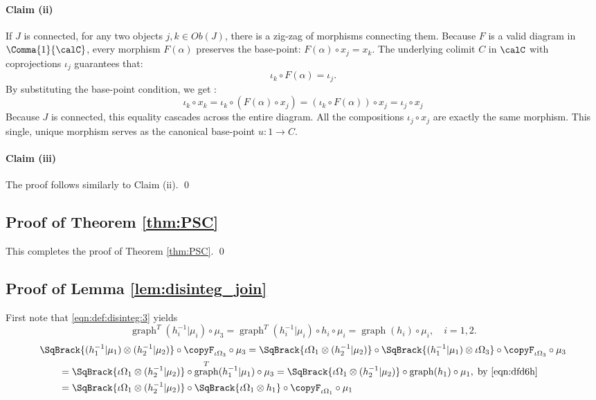 \documentclass[12pt,oneside,pb-diagram]{article}
\DeclareMathOperator{\graph}{graph}
\begin{document}
\paragraph{Claim (ii)} If $J$ is connected, for any two objects $j, k \in Ob(J)$, there is a zig-zag of morphisms connecting them. Because $F$ is a valid diagram in $\Comma{1}{\calC}$, every morphism $F(\alpha)$ preserves the base-point: $F(\alpha) \circ x_j = x_k$. The underlying colimit $C$ in $\calC$ with coprojections $\iota_j$ guarantees that:
\[\iota_k \circ F(\alpha) = \iota_j.\]
By substituting the base-point condition, we get : 
\[\iota_k \circ x_k = \iota_k \circ (F(\alpha) \circ x_j) = (\iota_k \circ F(\alpha)) \circ x_j = \iota_j \circ x_j\]
Because $J$ is connected, this equality cascades across the entire diagram. All the compositions $\iota_j \circ x_j$ are exactly the same morphism. This single, unique morphism serves as the canonical base-point $u: 1 \to C$.

\paragraph{Claim (iii)} The proof follows similarly to Claim (ii). \qed



\subsection{Proof of Theorem \ref{thm:PSC}} \label{sec:proof:PSC}

This completes the proof of Theorem \ref{thm:PSC}. \qed

\subsection{Proof of Lemma \ref{lem:disinteg_join}} \label{sec:proof:disinteg_join}

First note that \eqref{eqn:def:disinteg:3} yields
%
\begin{equation} \label{eqn:dfd6h}
	\graph^T(h_i^{-1}|\mu_i) \circ \mu_3 = \graph^T(h_i^{-1}|\mu_i) \circ h_i \circ \mu_i = \graph(h_i) \circ \mu_i, \quad i=1,2.
\end{equation}
%
%
\[\begin{split}
	& \SqBrack{ (h_1^{-1}|\mu_1) \otimes (h_2^{-1}|\mu_2) } \circ \copyF_{\iota \Omega_3} \circ \mu_3 = \SqBrack{ \iota \Omega_1 \otimes (h_2^{-1}|\mu_2) } \circ \SqBrack{ (h_1^{-1}|\mu_1) \otimes \iota \Omega_3 } \circ \copyF_{\iota \Omega_3} \circ \mu_3 \\
	& \quad \quad = \SqBrack{ \iota \Omega_1 \otimes (h_2^{-1}|\mu_2) } \circ \graph^T(h_1^{-1}|\mu_1) \circ \mu_3 = \SqBrack{ \iota \Omega_1 \otimes (h_2^{-1}|\mu_2) } \circ \graph(h_1) \circ \mu_1, \; \mbox{by \eqref{eqn:dfd6h}} \\
	& \quad \quad = \SqBrack{ \iota \Omega_1 \otimes (h_2^{-1}|\mu_2) } \circ \SqBrack{\iota \Omega_1 \otimes h_1} \circ \copyF_{\iota \Omega_1} \circ \mu_1
\end{split}\]
%
\end{document}
